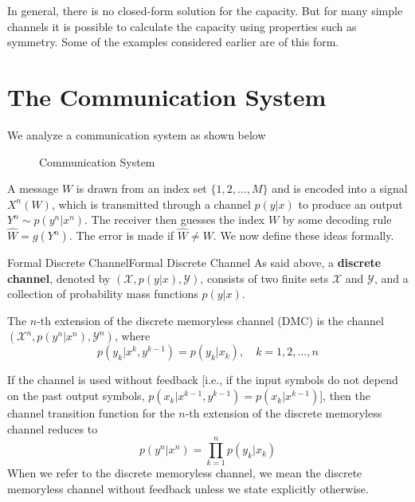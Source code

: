 \documentclass[../main.tex]{subfiles}
\begin{document}
In general, there is no closed-form solution for the capacity. But for many simple channels it is possible to calculate the capacity using properties such as symmetry. Some of the examples considered earlier are of this form.

\section{The Communication System}
We analyze a communication system as shown below
\begin{figure}[ht]
	\centering
	\caption{Communication System}
	\label{fig:communication-system}
\end{figure}

A message $W$ is drawn from an index set $\{1, 2, \ldots, M\}$ and is encoded into a signal $X^n(W)$, which is transmitted through a channel $p(y|x)$ to produce an output $Y^n \sim p(y^n|x^n)$. The receiver then guesses the index $W$ by some decoding rule $\hat{W} = g(Y^n)$. The error is made if $\hat{W} \neq W$. We now define these ideas formally.

\begin{definition}{Formal Discrete Channel}{Formal Discrete Channel}
	As said above, a \textbf{discrete channel}, denoted by $(\mathcal{X}, p(y|x), \mathcal{Y})$, consists of two finite sets $\mathcal{X}$ and $\mathcal{Y}$, and a collection of probability mass functions $p(y|x)$.

	The $n$-th extension of the discrete memoryless channel (DMC) is the channel $(\mathcal{X}^n, p(y^n|x^n), \mathcal{Y}^n)$, where
	\begin{equation}
		p(y_k|x^k, y^{k-1}) = p(y_k|x_k), \quad k=1,2,\ldots,n
	\end{equation}
\end{definition}

\begin{remark}
	If the channel is used without feedback [i.e., if the input symbols do not depend on the past output symbols, $p(x_k|x^{k-1}, y^{k-1}) = p(x_k|x^{k-1})$], then the channel transition function for the $n$-th extension of the discrete memoryless channel reduces to
	\begin{equation}
		p(y^n|x^n) = \prod_{k=1}^n p(y_k|x_k)
	\end{equation}
	When we refer to the discrete memoryless channel, we mean the discrete memoryless channel without feedback unless we state explicitly otherwise.
\end{remark}
\end{document}
